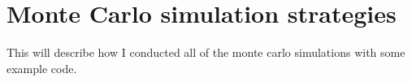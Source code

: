 

\chapter{Monte Carlo simulation strategies}
This will describe how I conducted all of the monte carlo simulations with some example code.
